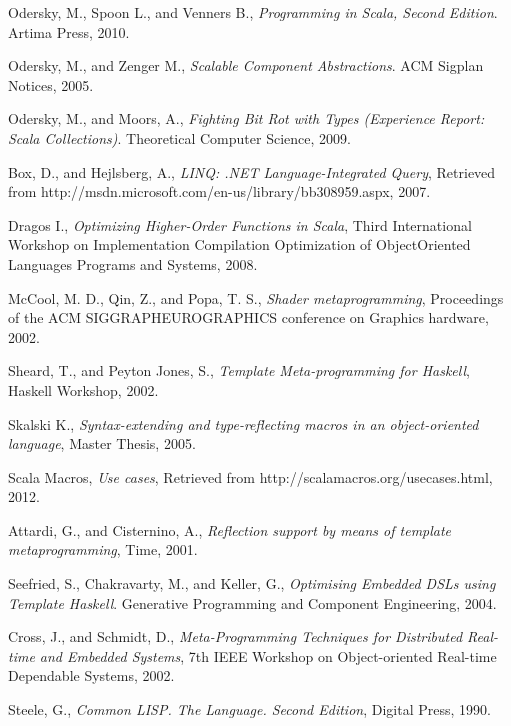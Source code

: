 \documentclass{llncs}
\begin{document}
\begin{thebibliography}{99}

  Odersky, M., Spoon L., and Venners B.,
  \emph{Programming in Scala, Second Edition}.
  Artima Press,
  2010.

  Odersky, M., and Zenger M.,
  \emph{Scalable Component Abstractions}.
  ACM Sigplan Notices,
  2005.

  Odersky, M., and Moors, A.,
  \emph{Fighting Bit Rot with Types (Experience Report: Scala Collections)}.
  Theoretical Computer Science,
  2009.

  Box, D., and Hejlsberg, A.,
  \emph{LINQ: .NET Language-Integrated Query},
  Retrieved from http://msdn.microsoft.com/en-us/library/bb308959.aspx,
  2007.

  Dragos I.,
  \emph{Optimizing Higher-Order Functions in Scala},
  Third International Workshop on Implementation Compilation Optimization of ObjectOriented Languages Programs and Systems,
  2008.

  McCool, M. D., Qin, Z., and Popa, T. S.,
  \emph{Shader metaprogramming},
  Proceedings of the ACM SIGGRAPHEUROGRAPHICS conference on Graphics hardware,
  2002.

  Sheard, T., and Peyton Jones, S.,
  \emph{Template Meta-programming for Haskell},
  Haskell Workshop,
  2002.

  Skalski K.,
  \emph{Syntax-extending and type-reflecting macros in an object-oriented language},
  Master Thesis,
  2005.

  Scala Macros,
  \emph{Use cases},
  Retrieved from http://scalamacros.org/usecases.html,
  2012.

  Attardi, G., and Cisternino, A.,
  \emph{Reflection support by means of template metaprogramming},
  Time,
  2001.

  Seefried, S., Chakravarty, M., and Keller, G.,
  \emph{Optimising Embedded DSLs using Template Haskell}.
  Generative Programming and Component Engineering,
  2004.

  Cross, J., and Schmidt, D.,
  \emph{Meta-Programming Techniques for Distributed Real-time and Embedded Systems},
  7th IEEE Workshop on Object-oriented Real-time Dependable Systems,
  2002.

  Steele, G.,
  \emph{Common LISP. The Language. Second Edition},
  Digital Press,
  1990.


\end{thebibliography}
\end{document}

